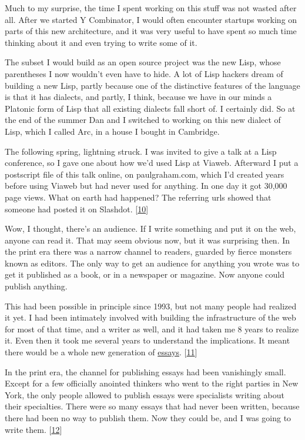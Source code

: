 Much to my surprise, the time I spent working on this stuff was not
wasted after all. After we started Y Combinator, I would often encounter
startups working on parts of this new architecture, and it was very
useful to have spent so much time thinking about it and even trying to
write some of it.

The subset I would build as an open source project was the new Lisp,
whose parentheses I now wouldn't even have to hide. A lot of Lisp
hackers dream of building a new Lisp, partly because one of the
distinctive features of the language is that it has dialects, and
partly, I think, because we have in our minds a Platonic form of Lisp
that all existing dialects fall short of. I certainly did. So at the end
of the summer Dan and I switched to working on this new dialect of Lisp,
which I called Arc, in a house I bought in Cambridge.

The following spring, lightning struck. I was invited to give a talk at
a Lisp conference, so I gave one about how we'd used Lisp at Viaweb.
Afterward I put a postscript file of this talk online, on
paulgraham.com, which I'd created years before using Viaweb but had
never used for anything. In one day it got 30,000 page views. What on
earth had happened? The referring urls showed that someone had posted it
on Slashdot. {[}\hyperref[f10n]{10}{]}

Wow, I thought, there's an audience. If I write something and put it on
the web, anyone can read it. That may seem obvious now, but it was
surprising then. In the print era there was a narrow channel to readers,
guarded by fierce monsters known as editors. The only way to get an
audience for anything you wrote was to get it published as a book, or in
a newspaper or magazine. Now anyone could publish anything.

This had been possible in principle since 1993, but not many people had
realized it yet. I had been intimately involved with building the
infrastructure of the web for most of that time, and a writer as well,
and it had taken me 8 years to realize it. Even then it took me several
years to understand the implications. It meant there would be a whole
new generation of \href{essay.html}{essays}. {[}\hyperref[f11n]{11}{]}

In the print era, the channel for publishing essays had been vanishingly
small. Except for a few officially anointed thinkers who went to the
right parties in New York, the only people allowed to publish essays
were specialists writing about their specialties. There were so many
essays that had never been written, because there had been no way to
publish them. Now they could be, and I was going to write them.
{[}\hyperref[f12n]{12}{]}

